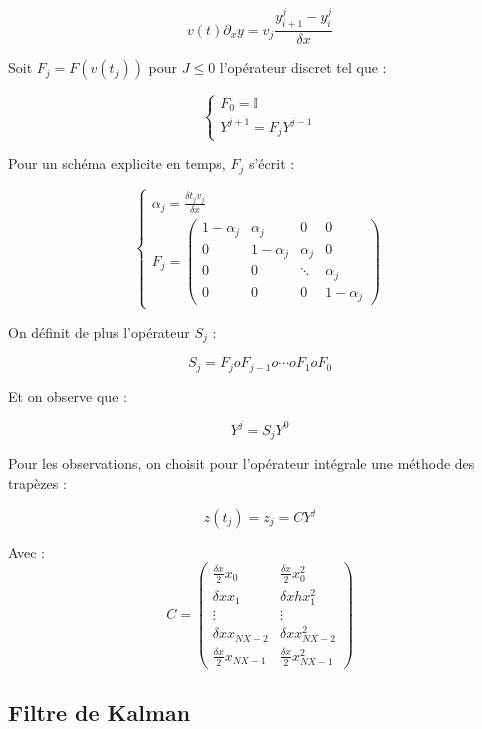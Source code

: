 \documentclass[a4paper]{article}
\begin{document}
\[ v(t)\partial_x y = v_j \frac{y_{i+1}^j - y_{i}^j}{\delta x} \]

Soit $F_j = F(v(t_j))$ pour $J \leq 0$ l'opérateur discret tel que :

\[ \begin{cases}
F_0 = \mathbb{I} \\
Y^{j+1} = F_j Y^{j-1} 
\end{cases}\]

Pour un schéma explicite en temps, $F_j$ s'écrit :

\[
\begin{cases}
	\alpha_j = \frac{\delta t_j v_{j}}{\delta x}  \\
	 F_j  =\left( \begin{array}{cccc}
	1-\alpha_j &    \alpha_j   &  0     & 0 \\
	0      & 1-\alpha_j   & \alpha_j   & 0 \\
	0      &   0     & \ddots &  \alpha_j \\
	0      & 0       &0        & 1-\alpha_j
	 \end{array} \right)
\end{cases}
\]

On définit de plus l'opérateur $S_j$ :

\[ S_j = F_j o F_{j-1} o \cdots o F_1 o F_0 \]

Et on observe que :

\[ Y^j= S_j Y^0\]

Pour les observations, on choisit pour l'opérateur intégrale une méthode des trapèzes :

\[ z(t_j) = z_j = CY^j\]

Avec :
\[
C =  \left( \begin{array}{cc}
	\frac{\delta x}{2} x_0       &  \frac{\delta x}{2}x_0^2   \\
	\delta x x_1       &  \delta xh x_1^2   \\
	\vdots      & \vdots     \\
	\delta x x_{NX-2}  & \delta xx_{NX-2}^2\\
    \frac{\delta x}{2} x_{NX-1}  & \frac{\delta x}{2} x_{NX-1}^2
	 \end{array} \right)
\]


\subsection{Filtre de Kalman}
\end{document}
